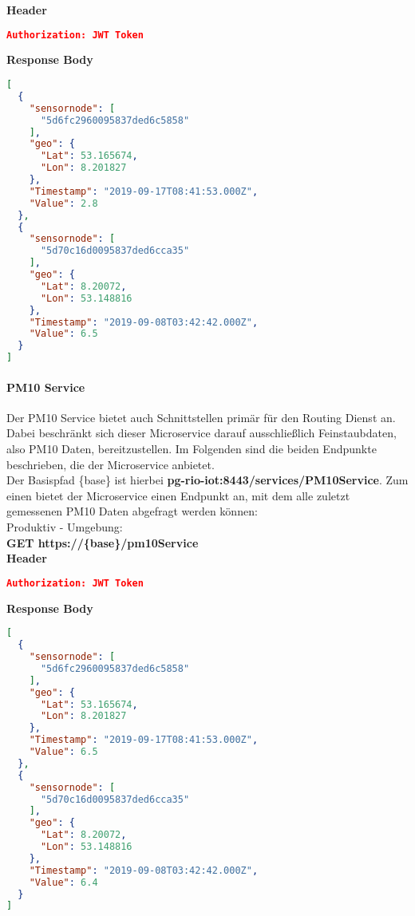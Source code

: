 \textbf{Header}
\begin{lstlisting}[language=json,firstnumber=1,basicstyle=\footnotesize]
Authorization: JWT Token
\end{lstlisting}
\textbf{Response Body}
\begin{lstlisting}[language=json,firstnumber=1,basicstyle=\footnotesize]
[
  {
    "sensornode": [
      "5d6fc2960095837ded6c5858"
    ],
    "geo": {
      "Lat": 53.165674,
      "Lon": 8.201827
    },
    "Timestamp": "2019-09-17T08:41:53.000Z",
    "Value": 2.8
  },
  {
    "sensornode": [
      "5d70c16d0095837ded6cca35"
    ],
    "geo": {
      "Lat": 8.20072,
      "Lon": 53.148816
    },
    "Timestamp": "2019-09-08T03:42:42.000Z",
    "Value": 6.5
  }
]
\end{lstlisting}

\paragraph{PM10 Service}
Der PM10 Service bietet auch Schnittstellen primär für den Routing Dienst an.
Dabei beschränkt sich dieser Microservice darauf ausschließlich Feinstaubdaten, also PM10 Daten, bereitzustellen.
Im Folgenden sind die beiden Endpunkte beschrieben, die der Microservice anbietet.
\\
Der Basispfad \{base\} ist hierbei \textbf{pg-rio-iot:8443/services/PM10Service}.
\newline
Zum einen bietet der Microservice einen Endpunkt an, mit dem alle zuletzt gemessenen PM10 Daten abgefragt werden können:
\newline
\\
Produktiv - Umgebung:
\\
\textbf{GET https://\{base\}/pm10Service}
\\
\textbf{Header}
\begin{lstlisting}[language=json,firstnumber=1,basicstyle=\footnotesize]
Authorization: JWT Token
\end{lstlisting}
\textbf{Response Body}
\begin{lstlisting}[language=json,firstnumber=1,basicstyle=\footnotesize]
[
  {
    "sensornode": [
      "5d6fc2960095837ded6c5858"
    ],
    "geo": {
      "Lat": 53.165674,
      "Lon": 8.201827
    },
    "Timestamp": "2019-09-17T08:41:53.000Z",
    "Value": 6.5
  },
  {
    "sensornode": [
      "5d70c16d0095837ded6cca35"
    ],
    "geo": {
      "Lat": 8.20072,
      "Lon": 53.148816
    },
    "Timestamp": "2019-09-08T03:42:42.000Z",
    "Value": 6.4
  }
]
\end{lstlisting}
